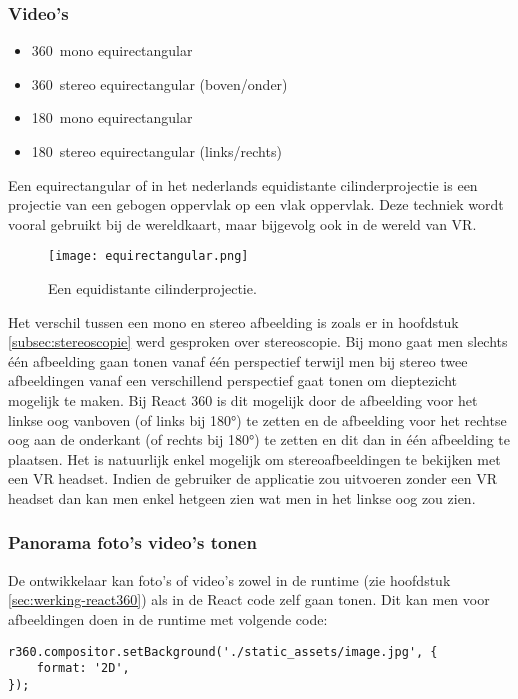 \subsubsection{Video's}
\begin{itemize}
	\item 360\textdegree\ mono equirectangular
	\item 360\textdegree\ stereo equirectangular (boven/onder)
	\item 180\textdegree\ mono equirectangular
	\item 180\textdegree\ stereo equirectangular (links/rechts)
\end{itemize}

Een equirectangular of in het nederlands equidistante cilinderprojectie is een projectie van een gebogen oppervlak op een vlak oppervlak. Deze techniek wordt vooral gebruikt bij de wereldkaart, maar bijgevolg ook in de wereld van VR. 

\begin{figure}
	\centering
	\texttt{[image: equirectangular.png]}
	\caption{Een equidistante cilinderprojectie.}
	\label{fig:eq-cilinder}
\end{figure}

Het verschil tussen een mono en stereo afbeelding is zoals er in hoofdstuk \ref{subsec:stereoscopie} werd gesproken over stereoscopie. Bij mono gaat men slechts één afbeelding gaan tonen vanaf één perspectief terwijl men bij stereo twee afbeeldingen vanaf een verschillend perspectief gaat tonen om dieptezicht mogelijk te maken. Bij React 360 is dit mogelijk door de afbeelding voor het linkse oog vanboven (of links bij 180°) te zetten en de afbeelding voor het rechtse oog aan de onderkant (of rechts bij 180°) te zetten en dit dan in één afbeelding te plaatsen. Het is natuurlijk enkel mogelijk om stereoafbeeldingen te bekijken met een VR headset. Indien de gebruiker de applicatie zou uitvoeren zonder een VR headset dan kan men enkel hetgeen zien wat men in het linkse oog zou zien.

\subsubsection{Panorama foto's video's tonen}
De ontwikkelaar kan foto's of video's zowel in de runtime (zie hoofdstuk \ref{sec:werking-react360}) als in de React code zelf gaan tonen. Dit kan men voor afbeeldingen doen in de runtime met volgende code:

\begin{lstlisting}[frame=single, caption=Een afbeelding als achtergrond instellen in de runtime.]
r360.compositor.setBackground('./static_assets/image.jpg', {
	format: '2D',
});
\end{lstlisting}

